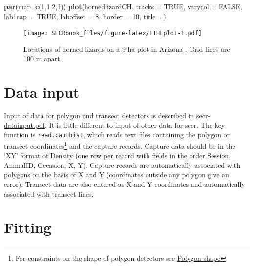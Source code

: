 \documentclass[
]{book}
\newenvironment{Shaded}{\begin{snugshade}}{\end{snugshade}}
\newcommand{\AttributeTok}[1]{\textcolor[rgb]{0.13,0.29,0.53}{#1}}
\newcommand{\ConstantTok}[1]{\textcolor[rgb]{0.56,0.35,0.01}{#1}}
\newcommand{\DecValTok}[1]{\textcolor[rgb]{0.00,0.00,0.81}{#1}}
\newcommand{\FunctionTok}[1]{\textcolor[rgb]{0.13,0.29,0.53}{\textbf{#1}}}
\newcommand{\NormalTok}[1]{#1}
\newcommand{\StringTok}[1]{\textcolor[rgb]{0.31,0.60,0.02}{#1}}
\begin{document}
\begin{Shaded}
\begin{Highlighting}[]
\FunctionTok{par}\NormalTok{(}\AttributeTok{mar=}\FunctionTok{c}\NormalTok{(}\DecValTok{1}\NormalTok{,}\DecValTok{1}\NormalTok{,}\DecValTok{2}\NormalTok{,}\DecValTok{1}\NormalTok{))}
\FunctionTok{plot}\NormalTok{(hornedlizardCH, }\AttributeTok{tracks =} \ConstantTok{TRUE}\NormalTok{, }\AttributeTok{varycol =} \ConstantTok{FALSE}\NormalTok{, }\AttributeTok{lab1cap =} 
    \ConstantTok{TRUE}\NormalTok{, }\AttributeTok{laboffset =} \DecValTok{8}\NormalTok{, }\AttributeTok{border =} \DecValTok{10}\NormalTok{, }\AttributeTok{title =}\StringTok{\textquotesingle{}\textquotesingle{}}\NormalTok{)}
\end{Highlighting}
\end{Shaded}

\begin{figure}
\centering
\texttt{[image: SECRbook\_files/figure-latex/FTHLplot-1.pdf]}
\caption{\label{fig:FTHLplot}Locations of horned lizards on a 9-ha plot in Arizona \citep{ry08}. Grid lines are 100 m apart.}
\end{figure}

\section{Data input}\label{data-input}

Input of data for polygon and transect detectors is described in \href{https://www.otago.ac.nz/density/pdfs/secr-datainput.pdf}{secr-datainput.pdf}. It is little different to input of other data for secr. The key function is \texttt{read.capthist}, which reads text files containing the polygon or transect coordinates\footnote{For constraints on the shape of polygon detectors see \hyperref[polygonshape]{Polygon shape}} and the capture records. Capture data should be in the `XY' format of
Density (one row per record with fields in the order Session, AnimalID, Occasion, X, Y). Capture records are automatically associated with polygons on the basis of X and Y (coordinates outside any polygon give an error). Transect data are also entered as X and Y coordinates and automatically associated with transect lines.

\section{Fitting}\label{fitting-1}
\end{document}
